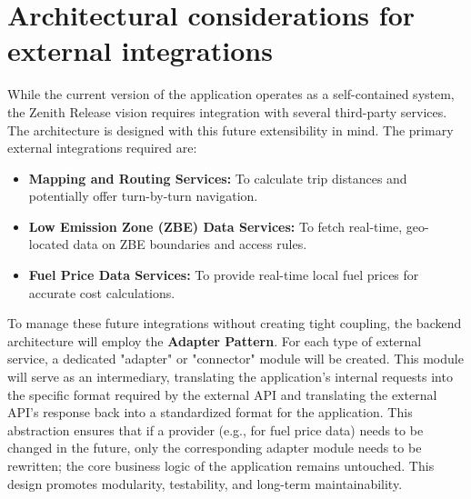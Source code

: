 \section{Architectural considerations for external integrations}

While the current version of the application operates as a self-contained system, the Zenith Release vision requires integration with several third-party services. The architecture is designed with this future extensibility in mind. The primary external integrations required are:

\begin{itemize}
    \item \textbf{Mapping and Routing Services:} To calculate trip distances and potentially offer turn-by-turn navigation.
    \item \textbf{Low Emission Zone (ZBE) Data Services:} To fetch real-time, geo-located data on ZBE boundaries and access rules.
    \item \textbf{Fuel Price Data Services:} To provide real-time local fuel prices for accurate cost calculations.
\end{itemize}

\textgap

To manage these future integrations without creating tight coupling, the backend architecture will employ the \textbf{Adapter Pattern}. For each type of external service, a dedicated "adapter" or "connector" module will be created. This module will serve as an intermediary, translating the application's internal requests into the specific format required by the external API and translating the external API's response back into a standardized format for the application. This abstraction ensures that if a provider (e.g., for fuel price data) needs to be changed in the future, only the corresponding adapter module needs to be rewritten; the core business logic of the application remains untouched. This design promotes modularity, testability, and long-term maintainability.
